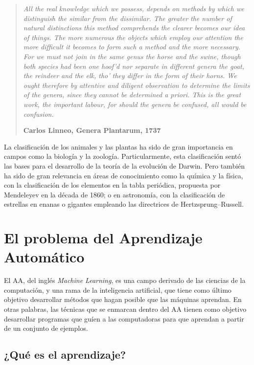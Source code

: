 \begin{quotation}{\slshape
		All the real knowledge which we possess, depends on methods by which we distinguish the similar from the dissimilar. The greater the number of natural distinctions this method comprehends the clearer becomes our idea of things. The
		more numerous the objects which employ our attention the more difficult it becomes to
		form such a method and the more necessary.
		For we must not join in the same genus the horse and the swine, though both species
		had been one hoof’d nor separate in different genera the goat, the reindeer and the elk,
		tho’ they differ in the form of their horns. We ought therefore by attentive and diligent
		observation to determine the limits of the genera, since they cannot be determined a
		priori. This is the great work, the important labour, for should the genera be confused,
		all would be confusion.} 
		\begin{flushright}
			\textbf{Carlos Linneo, Genera Plantarum, 1737}
		\end{flushright}
\end{quotation}

La clasificación de los animales y las plantas ha sido de gran importancia en campos como la biología y la zoología. Particularmente, esta clasificación sentó las bases para el desarrollo de la teoría de la evolución de Darwin. Pero también ha sido de gran relevancia en áreas de conocimiento como la química y la física, con la clasificación de los elementos en la tabla periódica, propuesta por Mendeleyev en la década de 1860; o en astronomía, con la clasificación de estrellas en enanas o gigantes empleando las directrices de Hertzsprung–Russell.

\section{El problema del Aprendizaje Automático}

El \acf{AA}, del inglés \textit{Machine Learning}, es una campo derivado de las ciencias de la computación, y una rama de la inteligencia artificial, que tiene como último objetivo desarrollar métodos que hagan posible que las máquinas aprendan. En otras palabras, las técnicas que se enmarcan dentro del \acs{AA} tienen como objetivo desarrollar programas que guíen a las computadoras para que aprendan a partir de un conjunto de ejemplos.

\subsection{¿Qué es el aprendizaje?}

